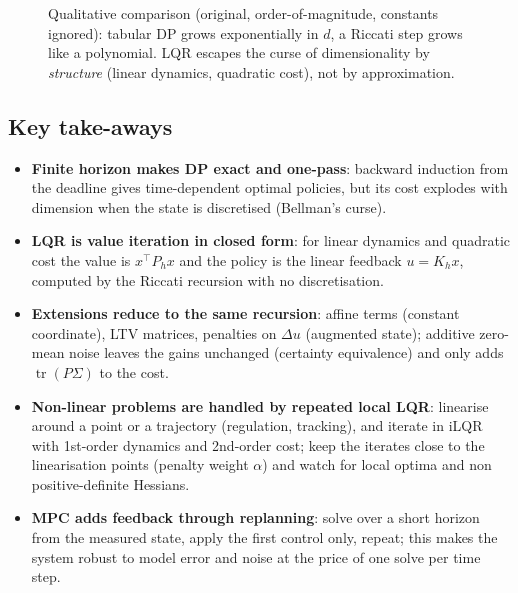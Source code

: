 \documentclass[11pt,a4paper]{article}
\newcommand{\tr}{\operatorname{tr}}
\theoremstyle{plain}
\theoremstyle{definition}
\theoremstyle{remark}
\begin{document}
\begin{figure}[H]
\centering
{}
\caption{Qualitative comparison (original, order-of-magnitude, constants ignored): tabular DP grows exponentially in $d$, a Riccati step grows like a polynomial. LQR escapes the curse of dimensionality by \emph{structure} (linear dynamics, quadratic cost), not by approximation.}
\end{figure}

\subsection{Key take-aways}

\begin{itemize}
  \item \textbf{Finite horizon makes DP exact and one-pass}: backward induction from the deadline gives time-dependent optimal policies, but its cost explodes with dimension when the state is discretised (Bellman's curse).
  \item \textbf{LQR is value iteration in closed form}: for linear dynamics and quadratic cost the value is $x^\top P_hx$ and the policy is the linear feedback $u=K_hx$, computed by the Riccati recursion with no discretisation.
  \item \textbf{Extensions reduce to the same recursion}: affine terms (constant coordinate), LTV matrices, penalties on $\Delta u$ (augmented state); additive zero-mean noise leaves the gains unchanged (certainty equivalence) and only adds $\tr(P\Sigma)$ to the cost.
  \item \textbf{Non-linear problems are handled by repeated local LQR}: linearise around a point or a trajectory (regulation, tracking), and iterate in iLQR with 1st-order dynamics and 2nd-order cost; keep the iterates close to the linearisation points (penalty weight $\alpha$) and watch for local optima and non positive-definite Hessians.
  \item \textbf{MPC adds feedback through replanning}: solve over a short horizon from the measured state, apply the first control only, repeat; this makes the system robust to model error and noise at the price of one solve per time step.
\end{itemize}
\end{document}
